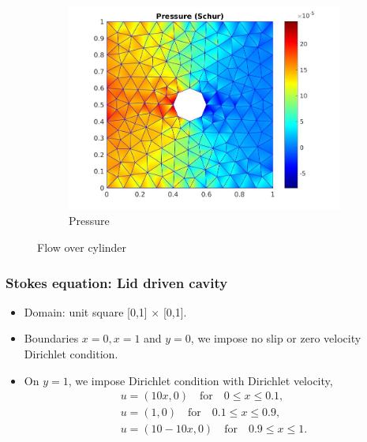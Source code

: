 \documentclass{beamer}
\begin{document}
\begin{frame}
\begin{figure}
\begin{subfigure}{0.3\textwidth}
    \includegraphics[width=\linewidth]{cylinder_schur_pressure.jpg}
    \caption{Pressure}
      \label{pressure_stoke_schur}
\end{subfigure}
\caption{Flow over cylinder}
\label{flow_over_cylinder_schur}
\end{figure}
\end{frame}
\begin{frame}
\frametitle{Stokes equation: Lid driven cavity}
\begin{itemize}
\item Domain: unit square [0,1] $\times$ [0,1].
\item Boundaries ${x = 0}, {x = 1}$ and ${y = 0}$, we impose no slip or zero velocity Dirichlet condition. 
\item On ${y = 1}$, we impose Dirichlet condition with Dirichlet velocity,
\begin{equation}
\begin{split}
u = (10x,0) \quad \textrm{for} \quad 0 \leq x \leq 0.1 \textrm{,}\\
u = (1,0) \quad \textrm{for} \quad 0.1 \leq x \leq 0.9 \textrm{,}\\
u = (10 - 10x,0) \quad \textrm{for} \quad 0.9 \leq x \leq 1 \textrm{.}
\end{split}
\end{equation}
\end{itemize}
\end{frame}
\end{document}
